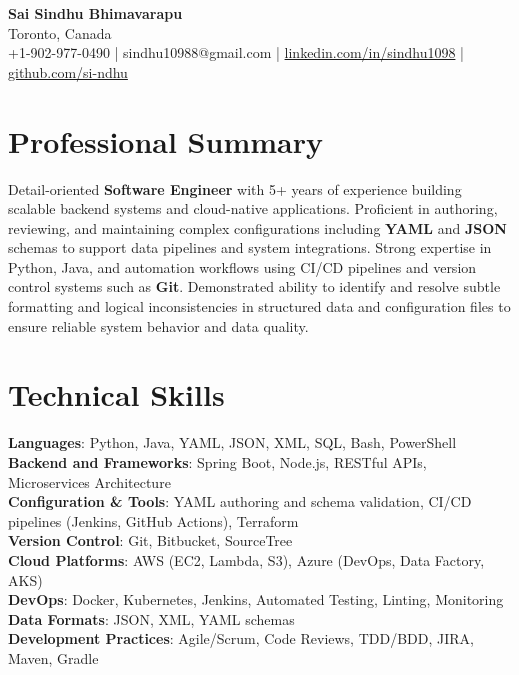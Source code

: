 \documentclass[letterpaper,11pt]{article}
\begin{document}
\begin{center}
  {\Large \textbf{Sai Sindhu Bhimavarapu}} \\
  Toronto, Canada \\
  +1-902-977-0490 \enspace | \enspace sindhu10988@gmail.com \enspace | \enspace \href{https://www.linkedin.com/in/sindhu1098/}{linkedin.com/in/sindhu1098} \enspace | \enspace \href{https://github.com/si-ndhu}{github.com/si-ndhu}
\end{center}

\section{Professional Summary}
  \begin{itemize}[leftmargin=0.15in, label={}]
    \small{\item{
     Detail-oriented \textbf{Software Engineer} with 5+ years of experience building scalable backend systems and cloud-native applications. Proficient in authoring, reviewing, and maintaining complex configurations including \textbf{YAML} and \textbf{JSON} schemas to support data pipelines and system integrations. Strong expertise in Python, Java, and automation workflows using CI/CD pipelines and version control systems such as \textbf{Git}. Demonstrated ability to identify and resolve subtle formatting and logical inconsistencies in structured data and configuration files to ensure reliable system behavior and data quality.
    }}
  \end{itemize}
\vspace{-16pt}

\section{Technical Skills}
 \begin{itemize}[leftmargin=0.15in, label={}]
    \small{\item{
     \textbf{Languages}: Python, Java, YAML, JSON, XML, SQL, Bash, PowerShell \\
     \textbf{Backend and Frameworks}: Spring Boot, Node.js, RESTful APIs, Microservices Architecture \\
     \textbf{Configuration \& Tools}: YAML authoring and schema validation, CI/CD pipelines (Jenkins, GitHub Actions), Terraform \\
     \textbf{Version Control}: Git, Bitbucket, SourceTree \\
     \textbf{Cloud Platforms}: AWS (EC2, Lambda, S3), Azure (DevOps, Data Factory, AKS) \\
     \textbf{DevOps}: Docker, Kubernetes, Jenkins, Automated Testing, Linting, Monitoring \\
     \textbf{Data Formats}: JSON, XML, YAML schemas \\
     \textbf{Development Practices}: Agile/Scrum, Code Reviews, TDD/BDD, JIRA, Maven, Gradle
    }}
 \end{itemize}
\vspace{-16pt}
\end{document}
